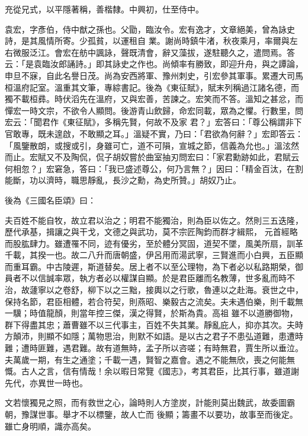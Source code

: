 \begin{pinyinscope}
 充從兄式，以平隱著稱，善楷隸。中興初，仕至侍中。



 袁宏，字彥伯，侍中猷之孫也。父勖，臨汝令。宏有逸才，文章絕美，曾為詠史詩，是其風情所寄。少孤貧，以運租自
 業。謝尚時鎮牛渚，秋夜乘月，率爾與左右微服泛江。會宏在舫中諷詠，聲既清會，辭又藻拔，遂駐聽久之，遣問焉。答云：「是袁臨汝郎誦詩。」即其詠史之作也。尚傾率有勝致，即迎升舟，與之譚論，申旦不寐，自此名譽日茂。尚為安西將軍、豫州刺史，引宏參其軍事。累遷大司馬桓溫府記室。溫重其文筆，專綜書記。後為《東征賦》，賦末列稱過江諸名德，而獨不載桓彞。時伏滔先在溫府，又與宏善，苦諫之。宏笑而不答。溫知之甚忿，而憚宏一時文宗，不欲令人顯問。後游青山飲歸，命宏同載，眾為之懼。行數里，問宏云：「聞君作《東征賦》，多稱先賢，何故不及家
 君？」宏答曰：「尊公稱謂非下官敢專，既未遑啟，不敢顯之耳。」溫疑不實，乃曰：「君欲為何辭？」宏即答云：「風鑒散朗，或搜或引，身雖可亡，道不可隕，宣城之節，信義為允也。」溫泫然而止。宏賦又不及陶侃，侃子胡奴嘗於曲室抽刃問宏曰：「家君勳跡如此，君賦云何相忽？」宏窘急，答曰：「我已盛述尊公，何乃言無？」因曰：「精金百汰，在割能斷，功以濟時，職思靜亂，長沙之勳，為史所贊。」胡奴乃止。



 後為《三國名臣頌》曰：



 夫百姓不能自牧，故立君以治之；明君不能獨治，則為臣以佐之。然則三五迭隆，歷代承基，揖讓之與干戈，文德之與武功，莫不宗匠陶鈞而群才緝熙，
 元首經略而股肱肆力。雖遭罹不同，迹有優劣，至於體分冥固，道契不墜，風美所扇，訓革千載，其揆一也。故二八升而唐朝盛，伊呂用而湯武寧，三賢進而小白興，五臣顯而重耳霸。中古陵遲，斯道替矣。居上者不以至公理物，為下者必以私路期榮，御員者不以信誠率眾，執方者必以權謀自顯。於是君臣離而名教薄，世多亂而時不治，故蘧寧以之卷舒，柳下以之三黜，接輿以之行歌，魯連以之赴海。衰世之中，保持名節，君臣相體，若合符契，則燕昭、樂毅古之流矣。夫未遇伯樂，則千載無一驥；時值龍顏，則當年控三傑，漢之得賢，於斯為貴。高祖
 雖不以道勝御物，群下得盡其忠；蕭曹雖不以三代事主，百姓不失其業。靜亂庇人，抑亦其次。夫時方顛沛，則顯不如隱；萬物思治，則默不如語。是以古之君子不患弘道難，患遭時難；遭時匪難，遇君難。故有道無時，孟子所以咨嗟；有時無君，賈生所以垂泣。夫萬歲一期，有生之通塗；千載一遇，賢智之嘉會。遇之不能無欣，喪之何能無慨。古人之言，信有情哉！余以暇日常覽《國志》，考其君臣，比其行事，雖道謝先代，亦異世一時也。



 文若懷獨見之照，而有救世之心，論時則人方塗炭，計能則莫出魏武，故委圖霸朝，豫謀世事。舉才不以標鑒，故人亡而
 後顯；籌畫不以要功，故事至而後定。雖亡身明順，識亦高矣。




\end{pinyinscope}
